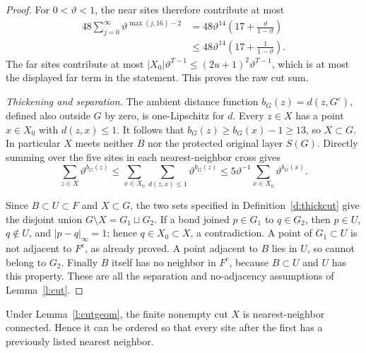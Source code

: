 \begin{proof}
For \(0<\vartheta<1\), the near sites therefore contribute at most
\[
 \begin{split}
 48\sum_{j=0}^{\infty}\vartheta^{\max(j,16)-2}
 &=48\vartheta^{14}
                    \left(17+\frac{\vartheta}{1-\vartheta}\right)\\
 &\le48\vartheta^{14}
                    \left(17+\frac1{1-\vartheta}\right).
 \end{split}
\]
The far sites contribute at most
\(|X_0|\vartheta^{T-1}\le(2u+1)^2\vartheta^{T-1}\),
which is at most the displayed far term in the statement.
This proves the raw cut sum.

\emph{Thickening and separation.}
The ambient distance function \(b_G(z)=d(z,G^c)\), defined
also outside \(G\) by zero, is one-Lipschitz for \(d\).
Every \(z\in X\) has a point \(x\in X_0\) with \(d(z,x)\le1\).
It follows that \(b_G(z)\ge b_G(x)-1\ge13\), so \(X\subset G\).
In particular \(X\) meets neither \(B\) nor the protected
original layer \(S(G)\).  Directly summing over the five sites
in each nearest-neighbor cross
gives
\[
 \sum_{z\in X}\vartheta^{b_G(z)}
    \le\sum_{x\in X_0}\sum_{d(z,x)\le1}
                              \vartheta^{b_G(z)}
    \le5\vartheta^{-1}\sum_{x\in X_0}\vartheta^{b_G(x)}.
\]

Since \(B\subset U\subset F\) and \(X\subset G\), the two
sets specified in Definition~\ref{d:thickcut} give the disjoint
union \(G\setminus X=G_1\sqcup G_2\).  If a bond joined
\(p\in G_1\) to \(q\in G_2\), then \(p\in U\), \(q\notin U\),
and \(|p-q|_\infty=1\); hence \(q\in X_0\subset X\), a
contradiction.  A point of \(G_1\subset U\) is not adjacent to
\(F^c\), as already proved.  A point adjacent to \(B\) lies
in \(U\), so cannot belong to \(G_2\).  Finally \(B\) itself
has no neighbor in \(F^c\), because \(B\subset U\) and
\(U\) has this property.  These are all the separation and
no-adjacency assumptions of Lemma~\ref{l:cut}.
\end{proof}

\begin{lemma}\label{l:Xconn}
Under Lemma~\ref{l:cutgeom}, the finite nonempty cut \(X\) is
nearest-neighbor connected. Hence it can be ordered so that every
site after the first has a previously listed nearest neighbor.
\end{lemma}

